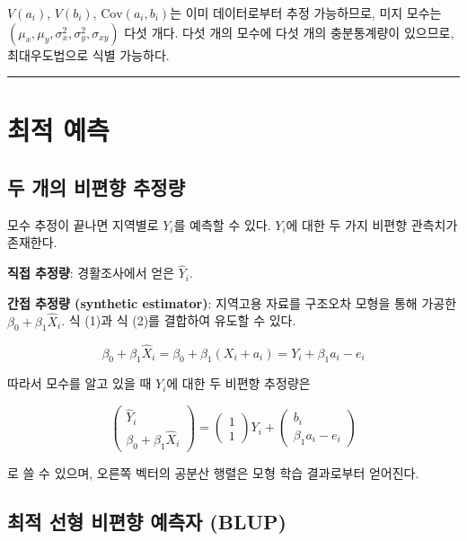 \documentclass[
  letterpaper,
  DIV=11,
  numbers=noendperiod]{scrreprt}
\begin{document}
\(V(a_i)\), \(V(b_i)\), \(\text{Cov}(a_i, b_i)\)는 이미 데이터로부터
추정 가능하므로, 미지 모수는
\((\mu_x, \mu_y, \sigma_x^2, \sigma_y^2, \sigma_{xy})\) 다섯 개다. 다섯
개의 모수에 다섯 개의 충분통계량이 있으므로, 최대우도법으로 식별
가능하다.

\begin{center}\rule{0.5\linewidth}{0.5pt}\end{center}

\section{최적 예측}\label{uxcd5cuxc801-uxc608uxce21-1}

\subsection{두 개의 비편향
추정량}\label{uxb450-uxac1cuxc758-uxbe44uxd3b8uxd5a5-uxcd94uxc815uxb7c9}

모수 추정이 끝나면 지역별로 \(Y_i\)를 예측할 수 있다. \(Y_i\)에 대한 두
가지 비편향 관측치가 존재한다.

\textbf{직접 추정량}: 경활조사에서 얻은 \(\hat{Y}_i\).

\textbf{간접 추정량 (synthetic estimator)}: 지역고용 자료를 구조오차
모형을 통해 가공한 \(\beta_0 + \beta_1 \hat{X}_i\). 식 (1)과 식 (2)를
결합하여 유도할 수 있다.

\[\beta_0 + \beta_1 \hat{X}_i = \beta_0 + \beta_1(X_i + a_i) = Y_i + \beta_1 a_i - e_i\]

따라서 모수를 알고 있을 때 \(Y_i\)에 대한 두 비편향 추정량은

\[\begin{pmatrix} \hat{Y}_i \\ \beta_0 + \beta_1 \hat{X}_i \end{pmatrix} = \begin{pmatrix} 1 \\ 1 \end{pmatrix} Y_i + \begin{pmatrix} b_i \\ \beta_1 a_i - e_i \end{pmatrix} \tag{5}\]

로 쓸 수 있으며, 오른쪽 벡터의 공분산 행렬은 모형 학습 결과로부터
얻어진다.

\subsection{최적 선형 비편향 예측자
(BLUP)}\label{uxcd5cuxc801-uxc120uxd615-uxbe44uxd3b8uxd5a5-uxc608uxce21uxc790-blup}
\end{document}
